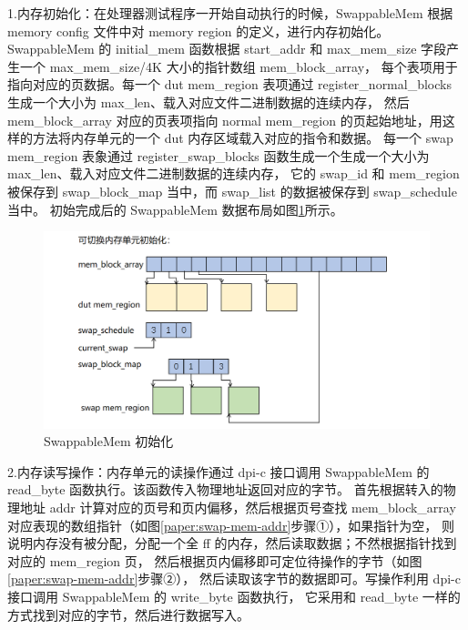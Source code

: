 1.内存初始化：在处理器测试程序一开始自动执行的时候，SwappableMem 根据 memory config 文件中对 memory region 的定义，进行内存初始化。
SwappableMem 的 initial\_mem 函数根据 start\_addr 和 max\_mem\_size 字段产生一个 max\_mem\_size/4K 大小的指针数组 mem\_block\_array，
每个表项用于指向对应的页数据。每一个 dut mem\_region 表项通过 register\_normal\_blocks 生成一个大小为 max\_len、载入对应文件二进制数据的连续内存，
然后 mem\_block\_array 对应的页表项指向 normal mem\_region 的页起始地址，用这样的方法将内存单元的一个 dut 内存区域载入对应的指令和数据。
每一个 swap mem\_region 表象通过 register\_swap\_blocks 函数生成一个生成一个大小为 max\_len、载入对应文件二进制数据的连续内存，
它的 swap\_id 和 mem\_region 被保存到 swap\_block\_map 当中，而 swap\_list 的数据被保存到 swap\_schedule 当中。
初始完成后的 SwappableMem 数据布局如图\ref{paper:swap-mem-init}所示。\par

\begin{figure}[!h]
    \centering
    \includegraphics[width=\linewidth]{figure/paper/swap-mem-init.png}
    \caption{SwappableMem 初始化}
    \label{paper:swap-mem-init}
\end{figure}

2.内存读写操作：内存单元的读操作通过 dpi-c 接口调用 SwappableMem 的 read\_byte 函数执行。该函数传入物理地址返回对应的字节。
首先根据转入的物理地址 addr 计算对应的页号和页内偏移，然后根据页号查找 mem\_block\_array 对应表现的数组指针（如图\ref{paper:swap-mem-addr}步骤①），如果指针为空，
则说明内存没有被分配，分配一个全 ff 的内存，然后读取数据；不然根据指针找到对应的 mem\_region 页，
然后根据页内偏移即可定位待操作的字节（如图\ref{paper:swap-mem-addr}步骤②），
然后读取该字节的数据即可。写操作利用 dpi-c 接口调用 SwappableMem 的 write\_byte 函数执行，
它采用和 read\_byte 一样的方式找到对应的字节，然后进行数据写入。\par


